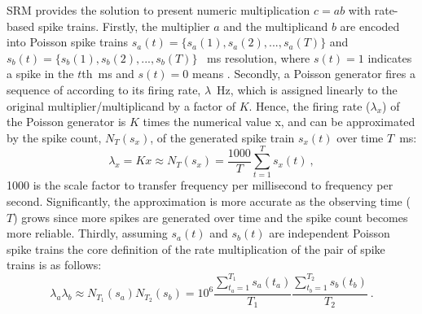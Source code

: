 SRM provides the solution to present numeric multiplication $c=ab$ with rate-based spike trains.
Firstly, the multiplier $a$ and the multiplicand $b$ are encoded into Poisson spike trains $s_a(t)=\{s_a(1),s_a(2),...,s_a(T)\}$ and $s_b(t)=\{s_b(1),s_b(2),...,s_b(T)\}$ \DIFdelbegin {}\DIFdelend \DIFaddbegin {}~ms resolution, where $s(t)=1$ indicates a spike in the $t$th~ms and $s(t)=0$ means \DIFdelbegin {}\DIFdelend \DIFaddbegin {}\DIFaddend .
Secondly, a Poisson generator fires a sequence of \DIFdelbegin {}\DIFdelend \DIFaddbegin {}\DIFaddend according to its firing rate, $\lambda$~Hz, which is assigned linearly to the original multiplier/multiplicand by a factor of $K$.
Hence, the firing rate ($\lambda_x$) of the Poisson generator is $K$ times the numerical value x, and can be approximated by the \DIFdelbegin {}\DIFdelend \DIFaddbegin {}\DIFaddend spike count, $N_T(s_x)$, of the generated spike train $s_x(t)$ over time \DIFdelbegin {}\DIFdelend $T$~ms:
\begin{equation}
\lambda_x = Kx \approx N_T(s_x) = \frac{1000}{T} \sum_{t=1}^{T} s_x(t)~,
\end{equation} 
1000 is the scale factor to transfer frequency per millisecond to frequency per second.
Significantly, the approximation is more accurate as the observing time ($T$) grows since more spikes are generated over time and the \DIFdelbegin {}\DIFdelend \DIFaddbegin {}\DIFaddend spike count becomes more reliable.
Thirdly, assuming $s_a(t)$ and $s_b(t)$ are independent Poisson spike trains the core definition of the rate multiplication of the pair of spike trains is as follows:
\begin{equation}
\lambda_a \lambda_b \approx N_{T_1}(s_a)N_{T_2}(s_b)= 10^6 \frac{\sum_{t_a=1}^{T_1}s_a(t_a)}{T_1}  \frac{\sum_{t_b=1}^{T_2} s_b(t_b)}{T_2}~.
\label{equ:mul}
\end{equation} 

